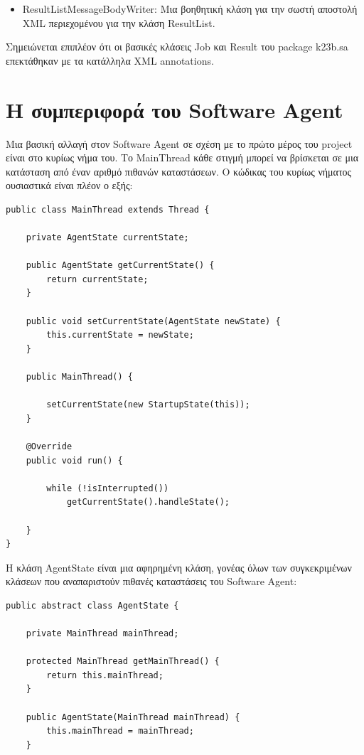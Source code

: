 \documentclass[a4paper,11pt]{article}
\begin{document}
\begin{sloppypar}
\begin{itemize}
\item ResultListMessageBodyWriter: Μια βοηθητική κλάση για την σωστή αποστολή XML περιεχομένου για την κλάση ResultList.

\end{itemize}
Σημειώνεται επιπλέον ότι οι βασικές κλάσεις Job και Result του package k23b.sa επεκτάθηκαν με τα κατάλληλα XML annotations.

\newpage

\section{Η συμπεριφορά του Software Agent}

Μια βασική αλλαγή στον Software Agent σε σχέση με το πρώτο μέρος του project είναι στο κυρίως νήμα του. Το MainThread κάθε στιγμή μπορεί να βρίσκεται σε μια κατάσταση από έναν αριθμό πιθανών καταστάσεων. Ο κώδικας του κυρίως νήματος ουσιαστικά είναι πλέον ο εξής:
\begin{lstlisting}
public class MainThread extends Thread {

    private AgentState currentState;

    public AgentState getCurrentState() {
        return currentState;
    }

    public void setCurrentState(AgentState newState) {
        this.currentState = newState;
    }

    public MainThread() {

        setCurrentState(new StartupState(this));
    }

    @Override
    public void run() {

        while (!isInterrupted())
            getCurrentState().handleState();

    }
}

\end{lstlisting}

Η κλάση AgentState είναι μια αφηρημένη κλάση, γονέας όλων των συγκεκριμένων κλάσεων που αναπαριστούν πιθανές καταστάσεις του Software Agent:

\begin{lstlisting}
public abstract class AgentState {

    private MainThread mainThread;

    protected MainThread getMainThread() {
        return this.mainThread;
    }

    public AgentState(MainThread mainThread) {
        this.mainThread = mainThread;
    }
    

\end{lstlisting}
\end{sloppypar}
\end{document}
